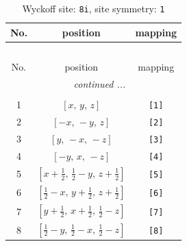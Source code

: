 \documentclass[fleqn,8pt]{jsarticle}
\begin{document}
\renewcommand{\arraystretch}{1.2}
\begin{longtable}{ccc}
\caption{Wyckoff site: {\tt 8i}, site symmetry: {\tt 1}}
 \\
 \hline \hline
No. & position & mapping \\ \hline \endfirsthead

\multicolumn{2}{l}{\tablename\ \thetable{}} \\
 \hline \hline
No. & position & mapping \\ \hline \endhead

 \hline \hline
\multicolumn{2}{r}{\footnotesize\it continued ...} \\ \endfoot

 \hline \hline
\multicolumn{2}{r}{} \\ \endlastfoot

1 & $\left[ x,\, y,\, z \right]$ & {\tt [1]} \\ \hline
2 & $\left[ - x,\, - y,\, z \right]$ & {\tt [2]} \\ \hline
3 & $\left[ y,\, - x,\, - z \right]$ & {\tt [3]} \\ \hline
4 & $\left[ - y,\, x,\, - z \right]$ & {\tt [4]} \\ \hline
5 & $\left[ x + \frac{1}{2},\, \frac{1}{2} - y,\, z + \frac{1}{2} \right]$ & {\tt [5]} \\ \hline
6 & $\left[ \frac{1}{2} - x,\, y + \frac{1}{2},\, z + \frac{1}{2} \right]$ & {\tt [6]} \\ \hline
7 & $\left[ y + \frac{1}{2},\, x + \frac{1}{2},\, \frac{1}{2} - z \right]$ & {\tt [7]} \\ \hline
8 & $\left[ \frac{1}{2} - y,\, \frac{1}{2} - x,\, \frac{1}{2} - z \right]$ & {\tt [8]} \\
\end{longtable}
\end{document}
